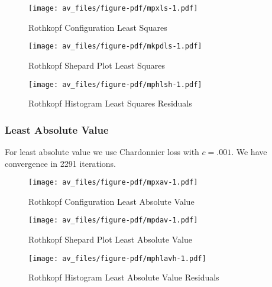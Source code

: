 \documentclass[
  12pt,
  letterpaper,
  DIV=11,
  numbers=noendperiod]{scrartcl}
\theoremstyle{plain}
\theoremstyle{plain}
\theoremstyle{plain}
\theoremstyle{definition}
\theoremstyle{remark}
\begin{document}
\begin{figure}[H]

{\centering \texttt{[image: av\_files/figure-pdf/mpxls-1.pdf]}

}

\caption{Rothkopf Configuration Least Squares}

\end{figure}%

\begin{figure}[H]

{\centering \texttt{[image: av\_files/figure-pdf/mkpdls-1.pdf]}

}

\caption{Rothkopf Shepard Plot Least Squares}

\end{figure}%

\begin{figure}[H]

{\centering \texttt{[image: av\_files/figure-pdf/mphlsh-1.pdf]}

}

\caption{Rothkopf Histogram Least Squares Residuals}

\end{figure}%

\subsubsection{Least Absolute Value}\label{least-absolute-value-1}

For least absolute value we use Chardonnier loss with \(c=.001\). We
have convergence in 2291 iterations.

\begin{figure}[H]

{\centering \texttt{[image: av\_files/figure-pdf/mpxav-1.pdf]}

}

\caption{Rothkopf Configuration Least Absolute Value}

\end{figure}%

\begin{figure}[H]

{\centering \texttt{[image: av\_files/figure-pdf/mpdav-1.pdf]}

}

\caption{Rothkopf Shepard Plot Least Absolute Value}

\end{figure}%

\begin{figure}[H]

{\centering \texttt{[image: av\_files/figure-pdf/mphlavh-1.pdf]}

}

\caption{Rothkopf Histogram Least Absolute Value Residuals}

\end{figure}%
\end{document}
